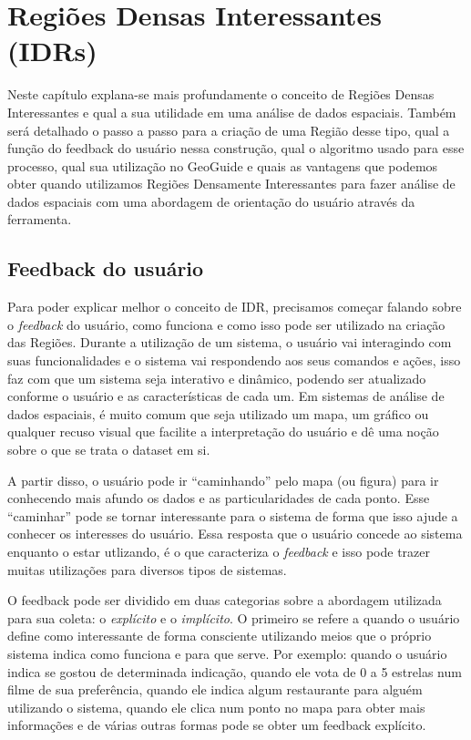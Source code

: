 \chapter{Regiões Densas Interessantes (IDRs)}
\label{chap:idrs}

Neste capítulo explana-se mais profundamente o conceito de Regiões Densas Interessantes e qual a sua utilidade em uma análise de dados espaciais. Também será detalhado o passo a passo para a criação de uma Região desse tipo, qual a função do feedback do usuário nessa construção, qual o algoritmo usado para esse processo, qual sua utilização no GeoGuide e quais as vantagens que podemos obter quando utilizamos Regiões Densamente Interessantes para fazer análise de dados espaciais com uma abordagem de orientação do usuário através da ferramenta.

\section{Feedback do usuário}

Para poder explicar melhor o conceito de IDR, precisamos começar falando sobre o \textit{feedback} do usuário, como funciona e como isso pode ser utilizado na criação das Regiões. Durante a utilização de um sistema, o usuário vai interagindo com suas funcionalidades e o sistema vai respondendo aos seus comandos e ações, isso faz com que um sistema seja interativo e dinâmico, podendo ser atualizado conforme o usuário e as características de cada um. Em sistemas de análise de dados espaciais, é muito comum que seja utilizado um mapa, um gráfico ou qualquer recuso visual que facilite a interpretação do usuário e dê uma noção sobre o que se trata o dataset em si.

A partir disso, o usuário pode ir ``caminhando'' pelo mapa (ou figura) para ir conhecendo mais afundo os dados e as particularidades de cada ponto. Esse ``caminhar'' pode se tornar interessante para o sistema de forma que isso ajude a conhecer os interesses do usuário. Essa resposta que o usuário concede ao sistema enquanto o estar utlizando, é o que caracteriza o \textit{feedback} e isso pode trazer muitas utilizações para diversos tipos de sistemas.

O feedback pode ser dividido em duas categorias sobre a abordagem utilizada para sua coleta: o \textit{explícito} e o \textit{implícito}. O primeiro se refere a quando o usuário define como interessante de forma consciente utilizando meios que o próprio sistema indica como funciona e para que serve. Por exemplo: quando o usuário indica se gostou de determinada indicação, quando ele vota de 0 a 5 estrelas num filme de sua preferência, quando ele indica algum restaurante para alguém utilizando o sistema, quando ele clica num ponto no mapa para obter mais informações e de várias outras formas pode se obter um feedback explícito.

